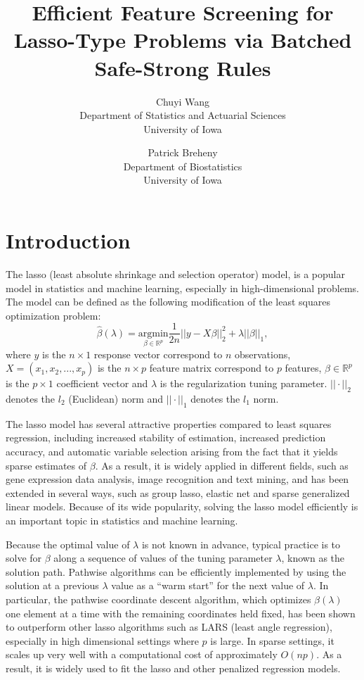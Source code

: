 \documentclass{article}
\title{Efficient Feature Screening for Lasso-Type
Problems via Batched Safe-Strong Rules}
\author{Chuyi Wang\\Department of Statistics and Actuarial Sciences\\University of Iowa
  \and
  Patrick Breheny\\Department of Biostatistics\\University of Iowa}
\date{}
\begin{document}
\maketitle

\section{Introduction}

The lasso (least absolute shrinkage and selection operator) model\citep{tibshirani1996regression}, is a popular model in statistics and machine learning, especially in high-dimensional problems. The model can be defined as the following modification of the least squares optimization problem:
\begin{equation}
    \hat{\beta}(\lambda)=\underset{\beta\in \mathbb{R}^p}{\mathrm{argmin}}\frac{1}{2n}||y-X\beta||_2^2+\lambda||\beta||_1,
\end{equation}
where $y$ is the $n\times 1$ response vector correspond to $n$ observations, $X=(x_1,x_2,...,x_p)$ is the $n\times p$ feature matrix correspond to $p$ features, $\beta\in \mathbb{R}^p$ is the $p\times 1$ coefficient vector and $\lambda$ is the regularization tuning parameter. $||\cdot||_2$ denotes the $l_2$ (Euclidean) norm and $||\cdot||_1$ denotes the $l_1$ norm. 

The lasso model has several attractive properties compared to least squares regression, including increased stability of estimation, increased prediction accuracy, and automatic variable selection arising from the fact that it yields sparse estimates of $\beta$.  As a result, it is widely applied in different fields, such as gene expression data analysis, image recognition and text mining, and has been extended in several ways, such as group lasso\cite{yuan2006model}, elastic net\cite{zou2005regularization} and sparse generalized linear models. Because of its wide popularity, solving the lasso model efficiently is an important topic in statistics and machine learning.

Because the optimal value of $\lambda$ is not known in advance, typical practice is to solve for $\beta$ along a sequence of values of the tuning parameter $\lambda$, known as the solution path.  Pathwise algorithms can be efficiently implemented by using the solution at a previous $\lambda$ value as a ``warm start'' for the next value of $\lambda$.  In particular, the pathwise coordinate descent algorithm\cite{friedman2007pathwise}, which optimizes $\beta(\lambda)$ one element at a time with the remaining coordinates held fixed, has been shown to outperform other lasso algorithms such as LARS (least angle regression)\cite{efron2004least}, especially in high dimensional settings where $p$ is large. In sparse settings, it scales up very well with a computational cost of approximately $O(np)$. As a result, it is widely used to fit the lasso and other penalized regression models.
\end{document}
